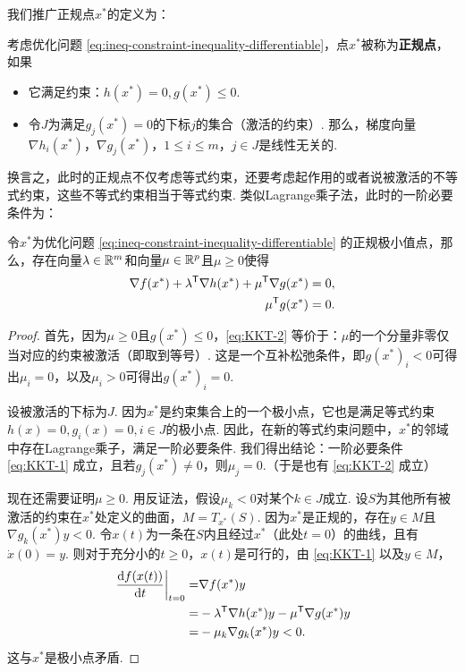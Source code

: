我们推广正规点$x^\ast$的定义为：
\begin{definition}[正规点]
考虑优化问题 \eqref{eq:ineq-constraint-inequality-differentiable}，点$x^\ast$被称为\textbf{正规点}，如果
\begin{itemize}
    \item 它满足约束：$h(x^\ast)=0, g(x^\ast)\le 0$.
    \item 令$J$为满足$g_j({x^\ast})=0$的下标$j$的集合（激活的约束）. 那么，梯度向量$\nabla h_i({x^\ast})$，$\nabla g_j({x^\ast})$，$1\le i \le m$，$j\in J$是线性无关的.
\end{itemize}
\end{definition}

换言之，此时的正规点不仅考虑等式约束，还要考虑起作用的或者说被激活的不等式约束，这些不等式约束相当于等式约束. 类似Lagrange乘子法，此时的一阶必要条件为：

\begin{theorem}\label{thm:KKT}
令${x^\ast}$为优化问题 \eqref{eq:ineq-constraint-inequality-differentiable} 的正规极小值点，那么，存在向量${\lambda}\in\mathbb{R}^m$和向量${\mu}\in \mathbb{R}^p$且${\mu\ge 0}$使得
\begin{align}
    \nabla f({x^\ast})+\lambda^{\mathsf{T}} \nabla {h(x^\ast)}+{\mu}^{\mathsf{T}} \nabla {g(x^\ast)}&={0},\label{eq:KKT-1}\\
    {\mu^{\mathsf{T}} g(x^\ast)}&=0.\label{eq:KKT-2}
\end{align}
\end{theorem}

\begin{proof}
首先，因为${\mu\ge 0}$且${g(x^\ast)\le 0}$，\eqref{eq:KKT-2} 等价于：${\mu}$的一个分量非零仅当对应的约束被激活（即取到等号）. 这是一个互补松弛条件，即${g(x^\ast)}_i<0$可得出$\mu_i=0$，以及$\mu_i>0$可得出${g(x^\ast)}_i=0.$

设被激活的下标为$J$. 因为${x^\ast}$是约束集合上的一个极小点，它也是满足等式约束$h(x)=0,g_i(x)=0,i\in J$的极小点. 因此，在新的等式约束问题中，${x^\ast}$的邻域中存在Lagrange乘子，满足一阶必要条件. 我们得出结论：一阶必要条件 \eqref{eq:KKT-1} 成立，且若$g_j({x^\ast})\neq0$，则$\mu_j=0$.（于是也有 \eqref{eq:KKT-2} 成立）

现在还需要证明${\mu \ge 0}$. 用反证法，假设$\mu_k<0$对某个$k\in J$成立. 设$S$为其他所有被激活的约束在${x^\ast}$处定义的曲面，$M=T_{x^\ast}(S)$. 因为$x^\ast$是正规的，存在${y}\in M$且$\nabla g_k({x^\ast})y<0$. 令${x}(t)$为一条在$S$内且经过${x^\ast}$（此处$t=0$）的曲线，且有$\dot{{x}}(0)={y}$. 则对于充分小的$t\ge 0$，${x}(t)$是可行的，由 \eqref{eq:KKT-1} 以及$y\in M$，
\begin{align*}
    \left.\frac{\mathrm{d} f({x}(t))}{\mathrm{d} t}\right|_{t=0}=&\nabla f({x^\ast})y\\
    =&-\lambda^{\mathsf{T}} \nabla {h(x^\ast)}y-{\mu}^{\mathsf{T}} \nabla {g(x^\ast)}y\\
    =&-\mu_k\nabla g_k({x^\ast})y<0. 
\end{align*}
这与${x^\ast}$是极小点矛盾. 
\end{proof}

